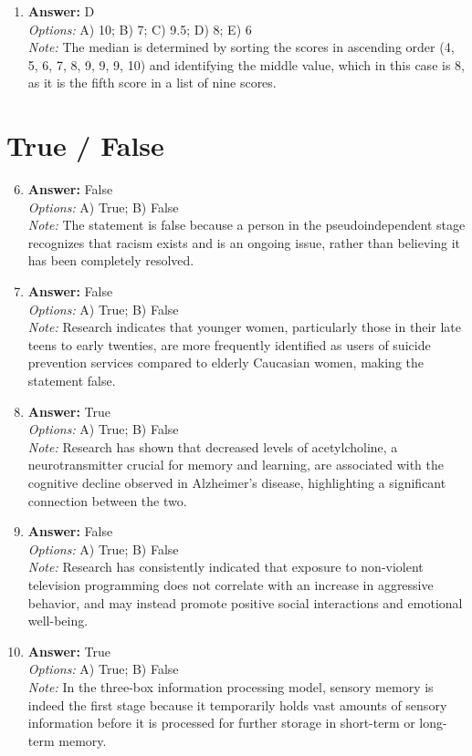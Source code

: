 \documentclass[12pt]{article}
\begin{document}
\begin{enumerate}[label=\arabic*.]
\\ \textit{Note:} Reality therapy focuses on helping individuals identify and change their perceptions of themselves from a "failure identity" to a "success identity," emphasizing personal responsibility and the fulfillment of basic needs through effective choices and goal-setting.
\item \textbf{Answer:} D
\\ \textit{Options:} A) 10; B) 7; C) 9.5; D) 8; E) 6
\\ \textit{Note:} The median is determined by sorting the scores in ascending order (4, 5, 6, 7, 8, 9, 9, 9, 10) and identifying the middle value, which in this case is 8, as it is the fifth score in a list of nine scores.
\end{enumerate}

\section*{True / False}
\begin{enumerate}[label=\arabic*.]
\setcounter{enumi}{5}
\item \textbf{Answer:} False
\\ \textit{Options:} A) True; B) False
\\ \textit{Note:} The statement is false because a person in the pseudoindependent stage recognizes that racism exists and is an ongoing issue, rather than believing it has been completely resolved.
\item \textbf{Answer:} False
\\ \textit{Options:} A) True; B) False
\\ \textit{Note:} Research indicates that younger women, particularly those in their late teens to early twenties, are more frequently identified as users of suicide prevention services compared to elderly Caucasian women, making the statement false.
\item \textbf{Answer:} True
\\ \textit{Options:} A) True; B) False
\\ \textit{Note:} Research has shown that decreased levels of acetylcholine, a neurotransmitter crucial for memory and learning, are associated with the cognitive decline observed in Alzheimer's disease, highlighting a significant connection between the two.
\item \textbf{Answer:} False
\\ \textit{Options:} A) True; B) False
\\ \textit{Note:} Research has consistently indicated that exposure to non-violent television programming does not correlate with an increase in aggressive behavior, and may instead promote positive social interactions and emotional well-being.
\item \textbf{Answer:} True
\\ \textit{Options:} A) True; B) False
\\ \textit{Note:} In the three-box information processing model, sensory memory is indeed the first stage because it temporarily holds vast amounts of sensory information before it is processed for further storage in short-term or long-term memory.
\end{enumerate}
\end{document}
